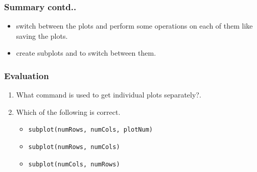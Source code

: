 \documentclass[17pt,compress]{beamer}
\begin{document}
\begin{frame}
\frametitle{Summary contd..}
\label{sec-7.2}
\begin{itemize}
\item switch between the plots and perform some operations on each
of them like saving the plots.
\item create subplots and to switch between them.
\end{itemize}
\end{frame}
\begin{frame}
\frametitle{Evaluation}
\label{sec-8}
\begin{enumerate}
\item What command is used to get individual plots separately?.\pause
\item Which of the following is correct.\pause
\begin{itemize}
\item \texttt{subplot(numRows, numCols, plotNum)}
\item \texttt{subplot(numRows, numCols)}
\item \texttt{subplot(numCols, numRows)}
\end{itemize}
\end{enumerate}
\end{frame}
\end{document}
